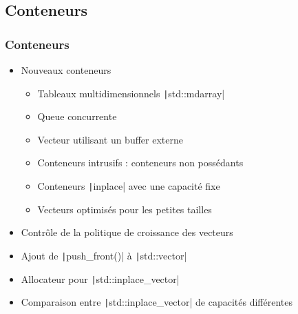 \documentclass[C++.tex]{subfiles}
\begin{document}
\subsection*{Conteneurs}
\begin{frame}[fragile]
	\frametitle{Conteneurs}
	\begin{itemize}
		\item Nouveaux conteneurs
		\begin{itemize}
			\item Tableaux multidimensionnels \texttt|std::mdarray|
			\item Queue concurrente
			\item Vecteur utilisant un buffer externe
			\item Conteneurs intrusifs : conteneurs non possédants


			\item Conteneurs \texttt|inplace| avec une capacité fixe
			\item Vecteurs optimisés pour les petites tailles
		\end{itemize}
		\item Contrôle de la politique de croissance des vecteurs
		\item Ajout de \texttt|push_front()| à \texttt|std::vector|
		\item Allocateur pour \texttt|std::inplace_vector|
		\item Comparaison entre \texttt|std::inplace_vector| de capacités différentes
	\end{itemize}

\end{frame}
\end{document}
